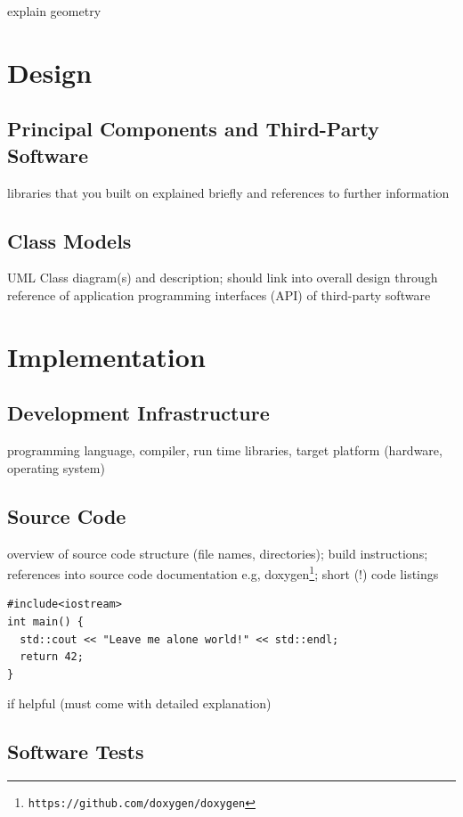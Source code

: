 \documentclass{article}
\begin{document}
explain geometry

\section{Design} \label{ch:design}

\subsection{Principal Components and Third-Party Software}

libraries that you built on explained briefly and references to further information

\subsection{Class Models}

UML Class diagram(s) and description; should link into overall design through
reference of application programming interfaces (API) of third-party software

\section{Implementation} \label{ch:implementation}

\subsection{Development Infrastructure}

programming language, compiler, run time libraries, target platform
(hardware, operating system)

\subsection{Source Code}

overview of source code structure (file names, directories); build instructions; references into source code documentation e.g, doxygen\footnote{\tt https://github.com/doxygen/doxygen}; short (!) code listings
\begin{lstlisting}
#include<iostream>
int main() {
  std::cout << "Leave me alone world!" << std::endl;
  return 42;
}
\end{lstlisting}
if helpful (must come with detailed explanation)

\subsection{Software Tests}
\end{document}
